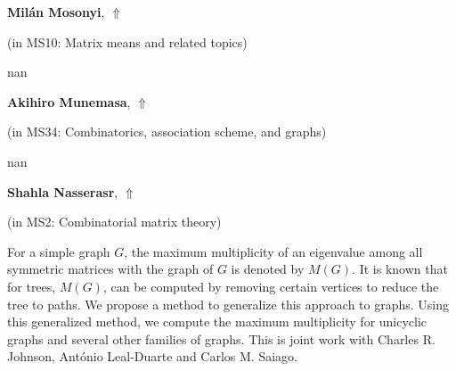 \documentclass[ILAS2025-program.tex]{subfiles}
\begin{document}
     \hypertarget{down0253}{}\begin{ilasabstract}
    
    \textbf{Milán Mosonyi},  \hfill \hyperlink{up0253}{$\Uparrow$}
    
    (in {\color{mstitle}MS10: Matrix means and related topics})
        
        \mtskip
    nan\end{ilasabstract}
     \hypertarget{down0286}{}\begin{ilasabstract}
    
    \textbf{Akihiro Munemasa},  \hfill \hyperlink{up0286}{$\Uparrow$}
    
    (in {\color{mstitle}MS34: Combinatorics, association scheme, and graphs})
        
        \mtskip
    nan\end{ilasabstract}
     \hypertarget{down0262}{}\begin{ilasabstract}
    
    \textbf{Shahla Nasserasr},  \hfill \hyperlink{up0262}{$\Uparrow$}
    
    (in {\color{mstitle}MS2: Combinatorial matrix theory})
        
        \mtskip
    For a simple graph $G$, the maximum multiplicity of an eigenvalue among all symmetric matrices with the graph of $G$ is denoted by $M(G)$. It is known that for trees, $M(G)$, can be computed by removing certain vertices to reduce the tree to paths. We propose a method to generalize this approach to graphs. Using this generalized method, we compute the maximum multiplicity for unicyclic graphs and several other families of graphs.
This is joint work with Charles R. Johnson, Ant\'onio Leal-Duarte and Carlos M. Saiago.
\end{ilasabstract}
\end{document}
